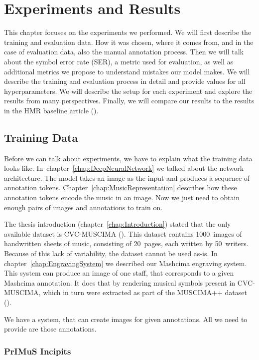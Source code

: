 \chapter{Experiments and Results}
\label{chap:ExperimentsAndResults}

This chapter focuses on the experiments we performed. We will first describe the training and evaluation data. How it was chosen, where it comes from, and in the case of evaluation data, also the manual annotation process. Then we will talk about the symbol error rate (SER), a metric used for evaluation, as well as additional metrics we propose to understand mistakes our model makes. We will describe the training and evaluation process in detail and provide values for all hyperparameters. We will describe the setup for each experiment and explore the results from many perspectives. Finally, we will compare our results to the results in the HMR baseline article (\cite{HmrBaseline}).


\section{Training Data}
\label{sec:TrainingData}

Before we can talk about experiments, we have to explain what the training data looks like. In~chapter~\ref{chap:DeepNeuralNetwork} we talked about the network architecture. The model takes an image as the input and produces a sequence of annotation tokens. Chapter~\ref{chap:MusicRepresentation} describes how these annotation tokens encode the music in an image. Now we just need to obtain enough pairs of images and annotations to train on.

The thesis introduction (chapter~\ref{chap:Introduction}) stated that the only available dataset is CVC-MUSCIMA (\cite{CvcMuscima}). This dataset contains 1000~images of handwritten sheets of music, consisting of 20~pages, each written by 50~writers. Because of this lack of variability, the dataset cannot be used as-is. In chapter~\ref{chap:EngravingSystem} we described our Mashcima engraving system. This system can produce an image of one staff, that corresponds to a given Mashcima annotation. It does that by rendering musical symbols present in CVC-MUSCIMA, which in turn were extracted as part of the MUSCIMA++ dataset (\cite{MuscimaPP}).

We have a system, that can create images for given annotations. All we need to provide are those annotations.


\subsection{PrIMuS Incipits}

